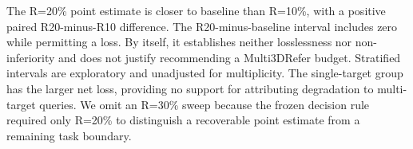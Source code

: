The R=20\% point estimate is closer to baseline than R=10\%, with a positive paired R20-minus-R10 difference. The R20-minus-baseline interval includes zero while permitting a loss. By itself, it establishes neither losslessness nor non-inferiority and does not justify recommending a Multi3DRefer budget. Stratified intervals are exploratory and unadjusted for multiplicity. The single-target group has the larger net loss, providing no support for attributing degradation to multi-target queries. We omit an R=30\% sweep because the frozen decision rule required only R=20\% to distinguish a recoverable point estimate from a remaining task boundary.
